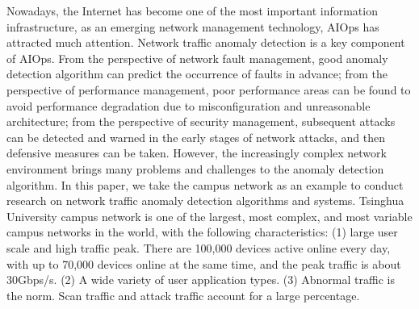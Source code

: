 \begin{abstract*}
  Nowadays, the Internet has become one of the most important information infrastructure, as an emerging network management technology, AIOps has attracted much attention. Network traffic anomaly detection is a key component of AIOps. From the perspective of network fault management, good anomaly detection algorithm can predict the occurrence of faults in advance; from the perspective of performance management, poor performance areas can be found to avoid performance degradation due to misconfiguration and unreasonable architecture; from the perspective of security management, subsequent attacks can be detected and warned in the early stages of network attacks, and then defensive measures can be taken. However, the increasingly complex network environment brings many problems and challenges to the anomaly detection algorithm. In this paper, we take the campus network as an example to conduct research on network traffic anomaly detection algorithms and systems. Tsinghua University campus network is one of the largest, most complex, and most variable campus networks in the world, with the following characteristics: (1) large user scale and high traffic peak. There are 100,000 devices active online every day, with up to 70,000 devices online at the same time, and the peak traffic is about 30Gbps/s. (2) A wide variety of user application types. (3) Abnormal traffic is the norm. Scan traffic and attack traffic account for a large percentage.


\end{abstract*}
